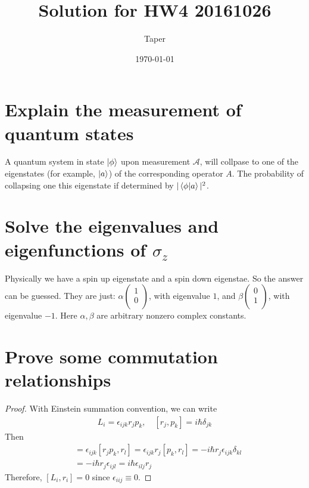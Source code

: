 \documentclass{article}
\title{Solution for HW4 20161026}
\date{\today}
\author{Taper}
\numberwithin{equation}{subsection} %
\theoremstyle{definition}
\begin{document}
\maketitle
{}
\section{Explain the measurement of quantum states}
A quantum system in state $\ket{\phi}$ upon measurement $\mathcal{A}$,
will collpase to one of the eigenstates (for example, $\ket{a}$) of the
corresponding operator $A$. The probability of collapsing one this
eigenstate if determined by $|\braket{\phi|a}|^2$.

\section{Solve the eigenvalues and eigenfunctions of
\texorpdfstring{$\sigma_z$}{}}

Physically we have a spin up eigenstate and a spin down eigenstae. So
the answer can be guessed. They are just:
$\alpha \left( \begin{array}{c}
 1 \\
 0 \\
\end{array} \right)$, with eigenvalue $1$, and
$\beta \left( \begin{array}{c}
 0 \\
 1 \\
\end{array} \right)$, with eigenvalue $-1$. Here $\alpha,\beta$ are
arbitrary nonzero complex constants.

\section{Prove some commutation relationships}
\begin{proof}
    With Einstein summation convention, we can write
\begin{align}
    L_i = \epsilon_{ijk} r_j p_k,\quad [r_j,p_k]= i\hbar\delta_{jk}
\end{align}
    Then
\begin{align}
    [L_i,r_l] &= \epsilon_{ijk} [r_j p_k,r_l] = \epsilon_{ijk}
    r_j[p_k,r_l] = -i\hbar r_j \epsilon_{ijk} \delta_{kl} \nonumber\\
    &= -i\hbar r_j \epsilon_{ijl} = i\hbar\epsilon_{ilj} r_j
\end{align}
Therefore, $[L_i,r_i] = 0$ since $\epsilon_{iij}\equiv 0$.
\end{proof}
\end{document}
